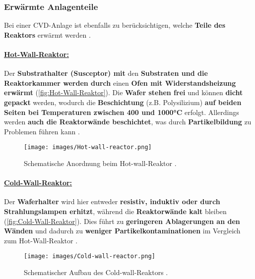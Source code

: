 \documentclass{article} %
\begin{document}
\vspace{1em}
\subsubsection{Erwärmte Anlagenteile} %
Bei einer CVD-Anlage ist ebenfalls zu berücksichtigen, welche \textbf{Teile des Reaktors} erwärmt werden \cite{keplinger2024CVD}.

\vspace{0.0em}
\paragraph{\uline{Hot-Wall-Reaktor:}} Der \textbf{Substrathalter (Susceptor) mit} den \textbf{Substraten und die Reaktorkammer werden durch} 
einen \textbf{Ofen mit Widerstandsheizung erwärmt} (\autoref{fig:Hot-Wall-Reaktor}). Die \textbf{Wafer stehen frei} und können 
\textbf{dicht gepackt} werden, wodurch die \textbf{Beschichtung} (z.B. Polysilizium) \textbf{auf beiden Seiten bei Temperaturen zwischen 400 
und 1000°C} erfolgt. Allerdings werden \textbf{auch die Reaktorwände beschichtet}, was durch \textbf{Partikelbildung} zu Problemen führen 
kann \cite{keplinger2024CVD}.

\begin{figure}[htb!]
    \centering
    \texttt{[image: images/Hot-wall-reactor.png]} %
    \captionsetup{labelfont=bf} %
    \caption{Schematische Anordnung beim Hot-wall-Reaktor \cite{keplinger2024CVD}.}
    \label{fig:Hot-Wall-Reaktor}
\end{figure}

\vspace{0.0em}
\paragraph{\uline{Cold-Wall-Reaktor:}} Der \textbf{Waferhalter} wird hier entweder \textbf{resistiv, induktiv oder durch Strahlungslampen 
erhitzt}, während die \textbf{Reaktorwände kalt} bleiben (\autoref{fig:Cold-Wall-Reaktor}). Dies führt zu \textbf{geringeren Ablagerungen an 
den Wänden} und dadurch zu \textbf{weniger Partikelkontaminationen} im Vergleich zum Hot-Wall-Reaktor \cite{keplinger2024CVD}.

\begin{figure}[htb!]
    \centering
    \texttt{[image: images/Cold-wall-reactor.png]} %
    \captionsetup{labelfont=bf} %
    \caption{Schematischer Aufbau des Cold-wall-Reaktors \cite{keplinger2024CVD}.}
    \label{fig:Cold-Wall-Reaktor}
\end{figure}
\end{document}
